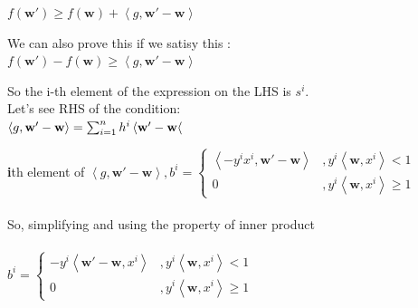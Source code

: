 \documentclass[a4paper,11pt]{article}
\begin{document}
\begin{mlsolution}
\begin{math}
f\left ( \textbf{w}{}' \right ) \geq f\left ( \textbf{w} \right ) + \left \langle g, \textbf{w}{}' - \textbf{w} \right \rangle
\end{math}

We can also prove this if we satisy this : \\

\begin{math}
f\left ( \textbf{w}{}' \right ) - f\left ( \textbf{w} \right ) \geq  \left \langle g, \textbf{w}{}' - \textbf{w} \right \rangle
\end{math}

So the i-th element of the expression on the LHS is \begin{math}
s^{i}.\end{math}\\

Let's see RHS of the condition:\\

\begin{math}\left \langle g, \textbf{w}{}' - \textbf{w} \right \rangle = \sum_{i=1}^{n} h^{i}\left \langle \textbf{w}{}' - \textbf{w} \right \langle \\
\end{math}

\textbf{i}th element of \begin{math}
\left \langle g, \textbf{w}{}' - \textbf{w} \right \rangle, b^{i} = \left\{\begin{matrix}
\left \langle -y^{i}x^{i}, \textbf{w}{}' - \textbf{w} \right \rangle & ,y^{i}\left \langle \textbf{w}, x^{i} \right \rangle < 1\\ 
0 & ,y^{i}\left \langle \textbf{w}, x^{i} \right \rangle \geq 1
\end{matrix}\right.
\end{math}\\\\

So, simplifying and using the property of inner product\\\\

\begin{math}
b^{i} = \left\{\begin{matrix}
-y^{i} \left \langle \textbf{w}{}' - \textbf{w}, x^{i}\right \rangle & ,y^{i}\left \langle \textbf{w}, x^{i} \right \rangle < 1\\ 
0 & ,y^{i}\left \langle \textbf{w}, x^{i} \right \rangle \geq 1
\end{matrix}\right.
\end{math}\\


\end{mlsolution}
\end{document}
